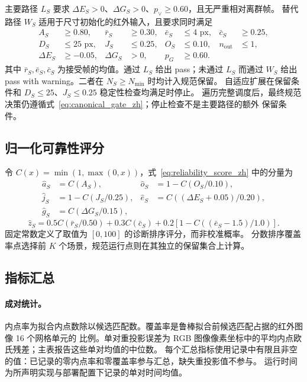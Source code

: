 主要路径 $L_S$ 要求 $\Delta E_S>0$、$\Delta G_S>0$、$p_{\lor}\ge0.60$，且无严重相对离群帧。
替代路径 $W_S$ 适用于尺寸初始化的红外输入，且要求同时满足
\begin{equation}
\begin{aligned}
A_S&\ge0.80, & \bar r_S&\ge0.30, & \bar e_S&\le4\text{ px}, & \bar c_S&\ge0.25, \\
D_S&\le25\text{ px}, & J_S&\le0.25, & O_S&\le0.10, & n_{\mathrm{out}}&\le1, \\
\Delta E_S&\ge-0.05, & \Delta G_S&>0, & p_G&\ge0.60. &&
\end{aligned}
\end{equation}
其中 $\bar r_S,\bar e_S,\bar c_S$ 为接受帧的均值。通过 $L_S$ 给出 pass；未通过 $L_S$ 而通过
$W_S$ 给出 pass with warning。二者在 $N_S\ge N_{\min}$ 时均计入规范保留。
自适应扩展在保留条件和 $D_S\le25$、$J_S\le0.25$ 稳定性检查均满足时停止。
遍历完整调度后，最终规范决策仍遵循式~\ref{eq:canonical_gate_zh}；停止检查不是主要路径的额外
保留条件。

\subsection{归一化可靠性评分}
\label{sec:score_normalization_zh}

令 $C(x)=\min(1,\max(0,x))$，式~\ref{eq:reliability_score_zh} 中的分量为
\begin{equation}
\begin{aligned}
\hat a_S &= C(A_S), & \hat o_S &= 1-C(O_S/0.10), \\
\hat j_S &= 1-C(J_S/0.25), & \hat e_S &= C((\Delta E_S+0.05)/0.20), \\
\hat g_S &= C(\Delta G_S/0.15), &&
\end{aligned}
\end{equation}
\begin{equation}
\hat z_S=0.5C(\bar r_S/0.50)+0.3C(\bar c_S)
       +0.2\left[1-C\!\left((\bar e_S-1.5)/1.0\right)\right].
\end{equation}
固定常数定义了取值为 $[0,100]$ 的诊断排序评分，而非校准概率。
分数排序覆盖率点选择前 $K$ 个场景，规范运行点则在其独立的保留集合上计算。

\subsection{指标汇总}
\label{sec:metric_aggregation_zh}

\paragraph{成对统计。}
内点率为拟合内点数除以候选匹配数。覆盖率是鲁棒拟合前候选匹配占据的红外图像 16 个网格单元的
比例。单对重投影误差为 RGB 图像像素坐标中的平均内点欧氏残差；主表报告这些单对均值的中位数。
每个汇总指标使用记录中有限且非空的值：已记录的零内点率和零覆盖率参与汇总，缺失重投影值不参与。
运行时间为所声明实现与部署配置下记录的单对时间均值。

